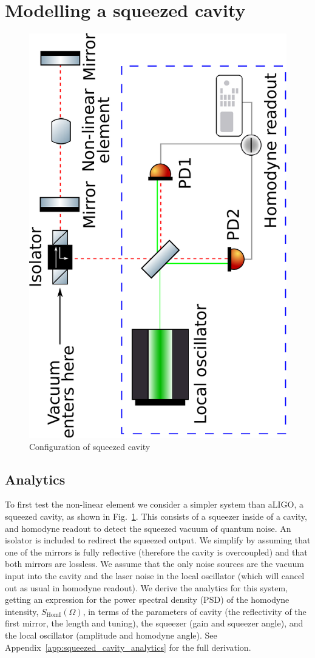 \documentclass[aps,pra,superscriptaddress,reprint,nofootinbib]{revtex4-1}
\begin{document}
\section{Modelling a squeezed cavity} %
\label{sec:sqzcavity}

\begin{figure}
	\begin{center}
	\includegraphics[height=0.7\textwidth, angle=-90]{figures/squeezed_cavity.pdf}
	\end{center}
	\caption{Configuration of squeezed cavity}
	\label{fig:squeezed_cavity}
\end{figure}

\subsection{Analytics}

To first test the non-linear element we consider a simpler system than aLIGO, a squeezed cavity, as shown in Fig.~\ref{fig:squeezed_cavity}. This consists of a squeezer inside of a cavity, and homodyne readout to detect the squeezed vacuum of quantum noise. An isolator is included to redirect the squeezed output. We simplify by assuming that one of the mirrors is fully reflective (therefore the cavity is overcoupled) and that both mirrors are lossless. We assume that the only noise sources are the vacuum input into the cavity and the laser noise in the local oscillator (which will cancel out as usual in homodyne readout).
We derive the analytics for this system, getting an expression for the power spectral density (PSD) of the homodyne intensity, $S_{\mathrm{HomI}}(\Omega)$, in terms of the parameters of cavity (the reflectivity of the first mirror, the length and tuning), the squeezer (gain and squeezer angle), and the local oscillator (amplitude and homodyne angle). See Appendix~\ref{app:squeezed_cavity_analytics} for the full derivation.
\end{document}
